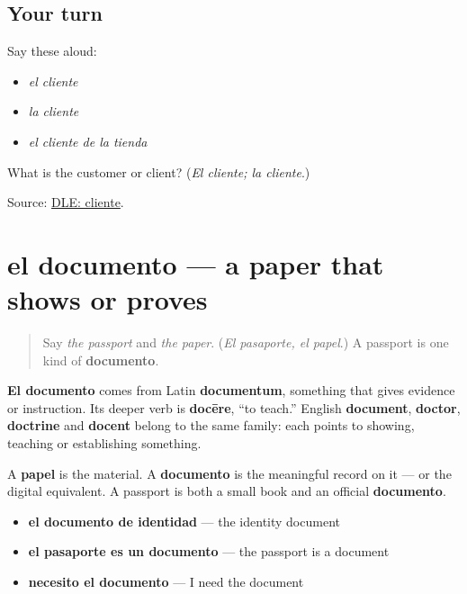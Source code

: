 \subsection*{Your turn}
Say these aloud:

\begin{itemize}
\raggedright
  \item \emph{el cliente}
  \item \emph{la cliente}
  \item \emph{el cliente de la tienda}
\end{itemize}

\begin{tcolorbox}[breakable,colback=teal!4,colframe=teal!35!black,title={Before you move on}]
What is the customer or client? (\emph{El cliente; la cliente}.)

Source: \href{https://dle.rae.es/cliente}{DLE: cliente}.
\end{tcolorbox}
\section[el documento]{el documento — a paper that shows or proves}

\label{lesson:ES-C406-documento}



\begin{quote}
Say \emph{the passport} and \emph{the paper}. (\emph{El pasaporte, el papel}.) A passport is one kind of \textbf{documento}.
\end{quote}

\begin{cousinweb}
\textbf{El documento} comes from Latin \textbf{documentum}, something that gives evidence or instruction. Its deeper verb is \textbf{docēre}, “to teach.” English \textbf{document}, \textbf{doctor}, \textbf{doctrine} and \textbf{docent} belong to the same family: each points to showing, teaching or establishing something.

A \textbf{papel} is the material. A \textbf{documento} is the meaningful record on it — or the digital equivalent. A passport is both a small book and an official \textbf{documento}.
\end{cousinweb}

\begin{grammarlens}[title={Grammar Lens: useful combinations}]
\begin{itemize}
\raggedright
  \item \textbf{el documento de identidad} — the identity document
  \item \textbf{el pasaporte es un documento} — the passport is a document
  \item \textbf{necesito el documento} — I need the document
\end{itemize}
\end{grammarlens}

